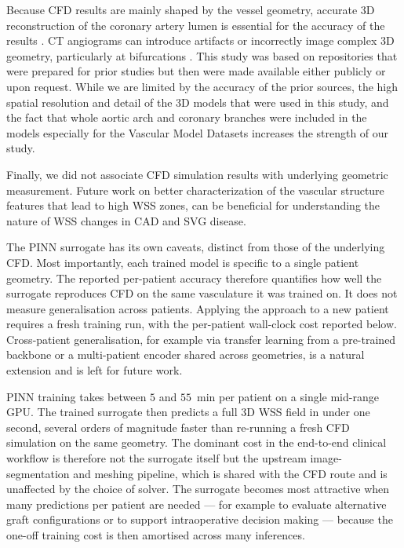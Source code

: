 ﻿\documentclass[12pt,a4paper]{article}
\newcommand{\added}[2][]{\begingroup\color{red}#2\endgroup}
\newcommand{\addp}[1]{\added{#1}}
\theoremstyle{definition}
\numberwithin{equation}{section}
\begin{document}
Because CFD results are mainly shaped by the vessel geometry, accurate 3D reconstruction of the coronary artery lumen is essential for the accuracy of the results \cite{75}. CT angiograms can introduce artifacts or incorrectly image complex 3D geometry, particularly at bifurcations \cite{76, 77}. This study was based on  repositories that were prepared for prior studies but then were made available either publicly or upon request. While we are limited by the accuracy of the prior sources, the high spatial resolution and detail of the 3D models that were used in this study, and the fact that whole aortic arch and coronary branches were included in the models especially for the Vascular Model Datasets increases the strength of our study.

Finally, we did not associate CFD simulation results with underlying geometric measurement. Future work on better characterization of the vascular structure features that lead to high WSS zones, can be beneficial for understanding the nature of WSS changes in CAD and SVG disease.

\addp{The PINN surrogate has its own caveats, distinct from those of the underlying CFD. Most importantly, each trained model is specific to a single patient geometry. The reported per-patient accuracy therefore quantifies how well the surrogate reproduces CFD on the same vasculature it was trained on. It does not measure generalisation across patients. Applying the approach to a new patient requires a fresh training run, with the per-patient wall-clock cost reported below. Cross-patient generalisation, for example via transfer learning from a pre-trained backbone or a multi-patient encoder shared across geometries, is a natural extension and is left for future work.}

\addp{PINN training takes between $5$ and $55$~min per patient on a single mid-range GPU. The trained surrogate then predicts a full 3D WSS field in under one second, several orders of magnitude faster than re-running a fresh CFD simulation on the same geometry. The dominant cost in the end-to-end clinical workflow is therefore not the surrogate itself but the upstream image-segmentation and meshing pipeline, which is shared with the CFD route and is unaffected by the choice of solver. The surrogate becomes most attractive when many predictions per patient are needed --- for example to evaluate alternative graft configurations or to support intraoperative decision making --- because the one-off training cost is then amortised across many inferences.}
\end{document}
